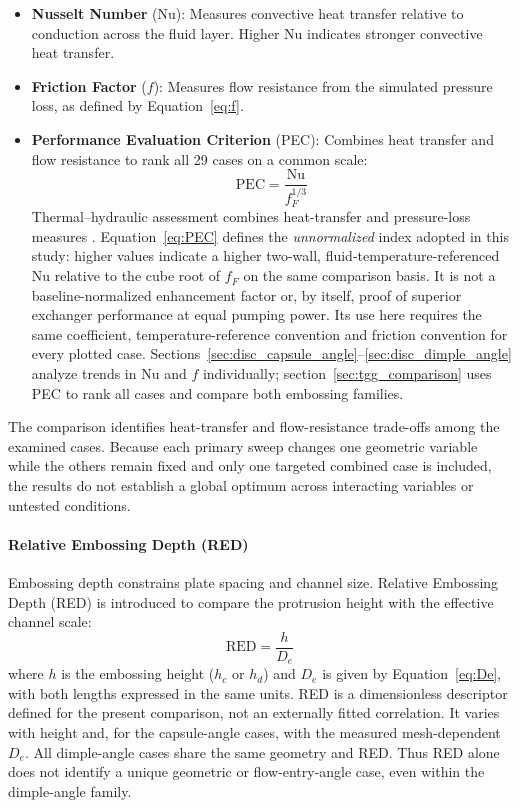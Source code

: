 \documentclass[energies,article,submit,moreauthors,noheaderline]{Definitions/mdpi}
\begin{document}
\begin{itemize}
  \item \textbf{Nusselt Number} (Nu): Measures convective heat transfer relative to conduction across the fluid layer. Higher Nu indicates stronger convective heat transfer.

  \item \textbf{Friction Factor} ($f$): Measures flow resistance from the simulated pressure loss, as defined by Equation~\eqref{eq:f}.

  \item \textbf{Performance Evaluation Criterion} (PEC): Combines heat transfer and flow resistance to rank all 29 cases on a common scale:
  \begin{equation}
  \mathrm{PEC} = \frac{\mathrm{Nu}}{f_F^{1/3}}
  \label{eq:PEC}
  \end{equation}
  Thermal--hydraulic assessment combines heat-transfer and pressure-loss measures \citep{thulukkanam2013,hamedi2024,jiang2019,jiang2020}. Equation~\eqref{eq:PEC} defines the \emph{unnormalized} index adopted in this study: higher values indicate a higher two-wall, fluid-temperature-referenced Nu relative to the cube root of $f_F$ on the same comparison basis. It is not a baseline-normalized enhancement factor or, by itself, proof of superior exchanger performance at equal pumping power. Its use here requires the same coefficient, temperature-reference convention and friction convention for every plotted case.
  Sections~\ref{sec:disc_capsule_angle}--\ref{sec:disc_dimple_angle} analyze trends in Nu and $f$ individually; section~\ref{sec:tgg_comparison} uses PEC to rank all cases and compare both embossing families.
\end{itemize}

The comparison identifies heat-transfer and flow-resistance trade-offs among the examined cases. Because each primary sweep changes one geometric variable while the others remain fixed and only one targeted combined case is included, the results do not establish a global optimum across interacting variables or untested conditions.

\paragraph{Relative Embossing Depth (RED)}
Embossing depth constrains plate spacing and channel size. Relative Embossing Depth (RED) is introduced to compare the protrusion height with the effective channel scale:
\begin{equation}
\text{RED} = \frac{h}{D_e}
\label{eq:red}
\end{equation}
where $h$ is the embossing height ($h_c$ or $h_d$) and $D_e$ is given by Equation~\eqref{eq:De}, with both lengths expressed in the same units. RED is a dimensionless descriptor defined for the present comparison, not an externally fitted correlation. It varies with height and, for the capsule-angle cases, with the measured mesh-dependent $D_e$. All dimple-angle cases share the same geometry and RED. Thus RED alone does not identify a unique geometric or flow-entry-angle case, even within the dimple-angle family.
\end{document}
